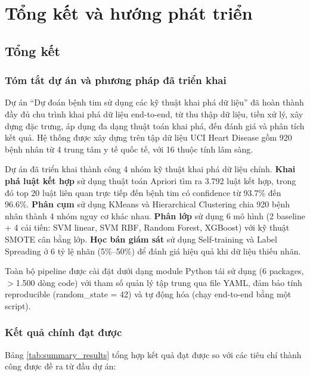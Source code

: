\chapter{Tổng kết và hướng phát triển}\label{chapter_conclusion}

\section{Tổng kết}

\subsection{Tóm tắt dự án và phương pháp đã triển khai}

Dự án ``Dự đoán bệnh tim sử dụng các kỹ thuật khai phá dữ liệu'' đã hoàn thành đầy đủ chu trình khai phá dữ liệu end-to-end, từ thu thập dữ liệu, tiền xử lý, xây dựng đặc trưng, áp dụng đa dạng thuật toán khai phá, đến đánh giá và phân tích kết quả. Hệ thống được xây dựng trên tập dữ liệu UCI Heart Disease gồm 920 bệnh nhân từ 4 trung tâm y tế quốc tế, với 16 thuộc tính lâm sàng.

Dự án đã triển khai thành công 4 nhóm kỹ thuật khai phá dữ liệu chính. \textbf{Khai phá luật kết hợp} sử dụng thuật toán Apriori tìm ra 3.792 luật kết hợp, trong đó top 20 luật liên quan trực tiếp đến bệnh tim có confidence từ 93.7\% đến 96.6\%. \textbf{Phân cụm} sử dụng KMeans và Hierarchical Clustering chia 920 bệnh nhân thành 4 nhóm nguy cơ khác nhau. \textbf{Phân lớp} sử dụng 6 mô hình (2 baseline + 4 cải tiến: SVM linear, SVM RBF, Random Forest, XGBoost) với kỹ thuật SMOTE cân bằng lớp. \textbf{Học bán giám sát} sử dụng Self-training và Label Spreading ở 6 tỷ lệ nhãn (5\%--50\%) để đánh giá hiệu quả khi dữ liệu thiếu nhãn.

Toàn bộ pipeline được cài đặt dưới dạng module Python tái sử dụng (6 packages, $>$1.500 dòng code) với tham số quản lý tập trung qua file YAML, đảm bảo tính reproducible (random\_state = 42) và tự động hóa (chạy end-to-end bằng một script).

\subsection{Kết quả chính đạt được}

Bảng \ref{tab:summary_results} tổng hợp kết quả đạt được so với các tiêu chí thành công được đề ra từ đầu dự án:

